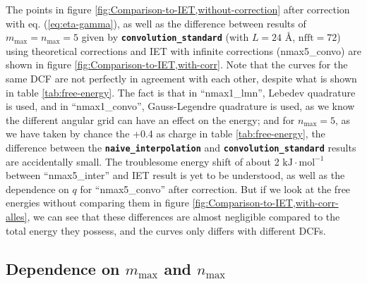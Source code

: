 The points in figure \ref{fig:Comparison-to-IET,without-correction}
after correction with eq. (\ref{eq:eta-gamma}), as well as the difference
between results of $m_{\max}=n_{\max}=5$ given by \texttt{\textbf{convolution\_standard}}
(with $L=24$ $\textrm{Å}$, $\mathrm{nfft}=72$) using theoretical
corrections and \acs{IET} with infinite corrections (nmax5\_convo)
are shown in figure \ref{fig:Comparison-to-IET,with-corr}. Note that
the curves for the same \acs{DCF} are not perfectly in agreement
with each other, despite what is shown in table \ref{tab:free-energy}.
The fact is that in ``nmax1\_lmn'', Lebedev quadrature is used,
and in ``nmax1\_convo'', Gauss-Legendre quadrature is used, as we
know the different angular grid can have an effect on the energy;
and for $n_{\max}=5$, as we have taken by chance the +0.4 as charge
in table \ref{tab:free-energy}, the difference between the \texttt{\textbf{naive\_interpolation}}
and \texttt{\textbf{convolution\_standard}} results are accidentally
small. The troublesome energy shift of about 2 $\mathrm{kJ}\cdot\mathrm{mol^{-1}}$
between ``nmax5\_inter'' and \acs{IET} result is yet to be understood,
as well as the dependence on $q$ for ``nmax5\_convo'' after correction.
But if we look at the free energies without comparing them in figure
\ref{fig:Comparison-to-IET,with-corr-alles}, we can see that these
differences are almost negligible compared to the total energy they
possess, and the curves only differs with different \acs{DCF}s.

\subsection{Dependence on $m_{\max}$ and $n_{\max}$}

